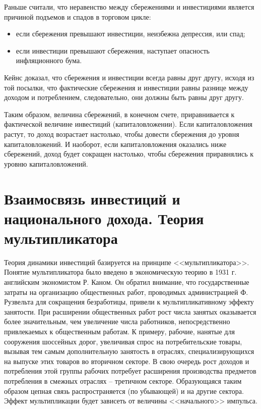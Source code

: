 Раньше считали, что неравенство между сбережениями и инвестициями является
причиной подъемов и спадов в торговом цикле:
\begin{itemize}
    \item если сбережения превышают инвестиции, неизбежна депрессия, или спад;
    \item если инвестиции превышают сбережения, наступает опасность
    инфляционного бума.
\end{itemize}

Кейнс доказал, что сбережения и инвестиции всегда равны друг другу, исходя из
той посылки, что фактические сбережения и инвестиции равны разнице между
доходом и потреблением, следовательно, они должны быть равны друг другу.

Таким образом, величина сбережений, в конечном счете, приравнивается к
фактической величине инвестиций (капиталовложении). Если капиталовложения
растут, то доход возрастает настолько, чтобы довести сбережения до уровня
капиталовложений. И наоборот, если капиталовложения оказались ниже сбережений,
доход будет сокращен настолько, чтобы сбережения приравнялись к уровню
капиталовложений.

\pagebreak %

\chapter{Взаимосвязь инвестиций и национального дохода. Теория мультипликатора}

Теория динамики инвестиций базируется на принципе <<мультипликатора>>. Понятие
мультипликатора было введено в экономическую теорию в 1931 г. английским
экономистом Р. Каном. Он обратил внимание, что государственные затраты на
организацию общественных работ, проводимых администрацией Ф. Рузвельта для
сокращения безработицы, привели к мультипликативному эффекту занятости. При
расширении общественных работ рост числа занятых оказывается более
значительным, чем увеличение числа работников, непосредственно привлекаемых к
общественным работам. К примеру, рабочие, нанятые для сооружения шоссейных
дорог, увеличивая спрос на потребительские товары, вызывая тем самым
дополнительную занятость в отраслях, специализирующихся на выпуске этих товаров
во вторичном секторе. В свою очередь рост доходов и потребления этой группы
рабочих потребует расширения производства предметов потребления в смежных
отраслях -- третичном секторе. Образующаяся таким образом цепная связь
распространяется (по убывающей) и на другие сектора. Эффект мультипликации
будет зависеть от величины <<начального>> импульса.

